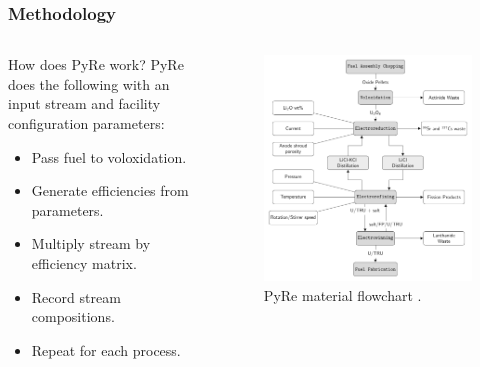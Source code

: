 \begin{frame}
  \frametitle{Methodology}
\begin{columns}
	\begin{column}{.45\textwidth}
		\begin{block}{How does PyRe work?} 
			PyRe does the following with an input stream and facility configuration parameters: 
			\begin{itemize}
				\item Pass fuel to voloxidation.
				\item Generate efficiencies from parameters.
				\item Multiply stream by efficiency matrix.
				\item Record stream compositions.
				\item Repeat for each process.
			\end{itemize}
		\end{block}
	\end{column}
	\begin{column}{.55\textwidth}
		\begin{figure}
			\centering
			\includegraphics[width=0.95\linewidth]{flowchart}
			\caption{PyRe material flowchart \cite{borrelli_approaches_2017}.}
			\label{fig:flowchart}
		\end{figure}
	\end{column}
\end{columns} 
\end{frame}

